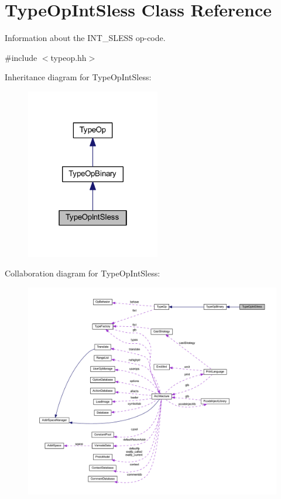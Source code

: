 \hypertarget{class_type_op_int_sless}{}\section{Type\+Op\+Int\+Sless Class Reference}
\label{class_type_op_int_sless}


Information about the I\+N\+T\+\_\+\+S\+L\+E\+SS op-\/code.  




{\ttfamily \#include $<$typeop.\+hh$>$}



Inheritance diagram for Type\+Op\+Int\+Sless\+:
\nopagebreak
\begin{figure}[H]
\begin{center}
\leavevmode
\includegraphics[width=166pt]{class_type_op_int_sless__inherit__graph}
\end{center}
\end{figure}


Collaboration diagram for Type\+Op\+Int\+Sless\+:
\nopagebreak
\begin{figure}[H]
\begin{center}
\leavevmode
\includegraphics[width=350pt]{class_type_op_int_sless__coll__graph}
\end{center}
\end{figure}
